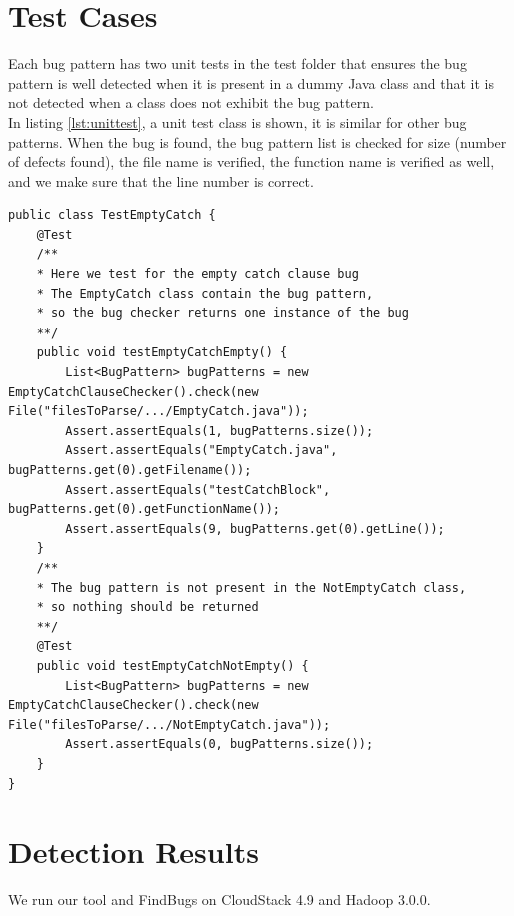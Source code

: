 \documentclass[sigconf]{acmart}
\begin{document}
\section{Test Cases}
Each bug pattern has two unit tests in the test folder that ensures the bug pattern is well detected when it is present in a dummy Java class and that it is not detected when a class does not exhibit the bug pattern.\\In listing \ref{lst:unittest}, a unit test class is shown, it is similar for other bug patterns. When the bug is found, the bug pattern list is checked for size (number of defects found), the file name is verified, the function name is verified as well, and we make sure that the line number is correct.
\newpage
\begin{lstlisting}[caption={Excerpt of the \texttt{TestEmptyCatch} class to unit test the \texttt{EmptyCatchClauseChecker}},captionpos=b,label={lst:unittest}]
public class TestEmptyCatch {
	@Test
    /**
    * Here we test for the empty catch clause bug
    * The EmptyCatch class contain the bug pattern,
    * so the bug checker returns one instance of the bug
    **/
	public void testEmptyCatchEmpty() {
		List<BugPattern> bugPatterns = new EmptyCatchClauseChecker().check(new File("filesToParse/.../EmptyCatch.java"));
		Assert.assertEquals(1, bugPatterns.size());
		Assert.assertEquals("EmptyCatch.java", bugPatterns.get(0).getFilename());
		Assert.assertEquals("testCatchBlock", bugPatterns.get(0).getFunctionName());
		Assert.assertEquals(9, bugPatterns.get(0).getLine());
	}
    /**
    * The bug pattern is not present in the NotEmptyCatch class,
    * so nothing should be returned
    **/
	@Test
	public void testEmptyCatchNotEmpty() {
		List<BugPattern> bugPatterns = new EmptyCatchClauseChecker().check(new File("filesToParse/.../NotEmptyCatch.java"));
		Assert.assertEquals(0, bugPatterns.size());
	}
}
\end{lstlisting}
\vspace{-3mm}

\section{Detection Results}
We run our tool and FindBugs on CloudStack 4.9 and Hadoop 3.0.0.
\end{document}
